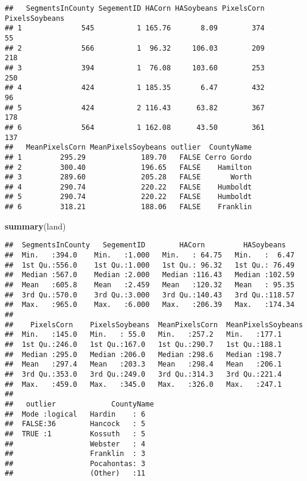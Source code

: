 \documentclass[
]{article}
\newenvironment{Shaded}{\begin{snugshade}}{\end{snugshade}}
\newcommand{\FunctionTok}[1]{\textcolor[rgb]{0.13,0.29,0.53}{\textbf{#1}}}
\newcommand{\NormalTok}[1]{#1}
\begin{document}
\begin{verbatim}
##   SegmentsInCounty SegementID HACorn HASoybeans PixelsCorn PixelsSoybeans
## 1              545          1 165.76       8.09        374             55
## 2              566          1  96.32     106.03        209            218
## 3              394          1  76.08     103.60        253            250
## 4              424          1 185.35       6.47        432             96
## 5              424          2 116.43      63.82        367            178
## 6              564          1 162.08      43.50        361            137
##   MeanPixelsCorn MeanPixelsSoybeans outlier  CountyName
## 1         295.29             189.70   FALSE Cerro Gordo
## 2         300.40             196.65   FALSE    Hamilton
## 3         289.60             205.28   FALSE       Worth
## 4         290.74             220.22   FALSE    Humboldt
## 5         290.74             220.22   FALSE    Humboldt
## 6         318.21             188.06   FALSE    Franklin
\end{verbatim}

\begin{Shaded}
\begin{Highlighting}[]
\FunctionTok{summary}\NormalTok{(land)}
\end{Highlighting}
\end{Shaded}

\begin{verbatim}
##  SegmentsInCounty   SegementID        HACorn         HASoybeans    
##  Min.   :394.0    Min.   :1.000   Min.   : 64.75   Min.   :  6.47  
##  1st Qu.:556.0    1st Qu.:1.000   1st Qu.: 96.32   1st Qu.: 76.49  
##  Median :567.0    Median :2.000   Median :116.43   Median :102.59  
##  Mean   :605.8    Mean   :2.459   Mean   :120.32   Mean   : 95.35  
##  3rd Qu.:570.0    3rd Qu.:3.000   3rd Qu.:140.43   3rd Qu.:118.57  
##  Max.   :965.0    Max.   :6.000   Max.   :206.39   Max.   :174.34  
##                                                                    
##    PixelsCorn    PixelsSoybeans  MeanPixelsCorn  MeanPixelsSoybeans
##  Min.   :145.0   Min.   : 55.0   Min.   :257.2   Min.   :177.1     
##  1st Qu.:246.0   1st Qu.:167.0   1st Qu.:290.7   1st Qu.:188.1     
##  Median :295.0   Median :206.0   Median :298.6   Median :198.7     
##  Mean   :297.4   Mean   :203.3   Mean   :298.4   Mean   :206.1     
##  3rd Qu.:353.0   3rd Qu.:249.0   3rd Qu.:314.3   3rd Qu.:221.4     
##  Max.   :459.0   Max.   :345.0   Max.   :326.0   Max.   :247.1     
##                                                                    
##   outlier             CountyName
##  Mode :logical   Hardin    : 6  
##  FALSE:36        Hancock   : 5  
##  TRUE :1         Kossuth   : 5  
##                  Webster   : 4  
##                  Franklin  : 3  
##                  Pocahontas: 3  
##                  (Other)   :11
\end{verbatim}
\end{document}
